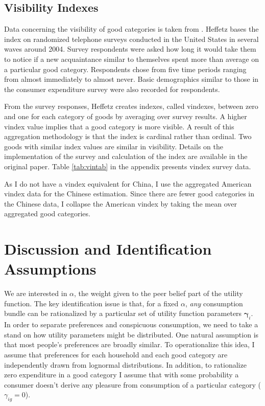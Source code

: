 \documentclass[11pt]{article}
\begin{document}
\begin{CJK}{UTF8}{gbsn}

\subsection{Visibility Indexes}
Data concerning the visibility of good categories is taken from \citet{heffetz2011}.  
Heffetz bases the index on randomized telephone surveys conducted in the United States in several waves around 2004.
Survey respondents were asked how long it would take them to notice if a new acquaintance similar to themselves spent more than average on a particular good category.
Respondents chose from five time periods ranging from almost immediately to almost never.
Basic demographics similar to those in the consumer expenditure survey were also recorded for respondents.

From the survey responses, Heffetz creates indexes, called vindexes, between zero and one for each category of goods by averaging over survey results.  A higher vindex value implies that a good category is more visible. 
A result of this aggregation methodology is that the index is cardinal rather than ordinal.  Two goods with similar index values are similar in visibility.  Details on the implementation of the survey and calculation of the index are available in the original paper.
Table \ref{tab:vintab} in the appendix presents vindex survey data.

As I do not have a vindex equivalent for China, I use the aggregated American vindex data for the Chinese estimation. Since there are fewer good categories in the Chinese data, I collapse the American vindex by taking the mean over aggregated good categories.

\section{Discussion and Identification Assumptions}
\label{sec:discussion}

We are interested in $\alpha$, the weight given to the peer belief part of the utility function.  The key identification issue is that, for a fixed $\alpha$, \emph{any} consumption bundle can be rationalized by a particular set of utility function parameters $\boldsymbol{\gamma}_i$.  In order to separate preferences and conspicuous consumption, we need to take a stand on how utility parameters might be distributed.  One natural assumption is that most people's preferences are broadly similar.  To operationalize this idea, I assume that preferences for each household and each good category are independently drawn from lognormal distributions.  In addition, to rationalize zero expenditure in a good category I assume that with some probability a consumer doesn't derive any pleasure from consumption of a particular category ($\gamma_{ig} = 0$).


\end{CJK}
\end{document}
